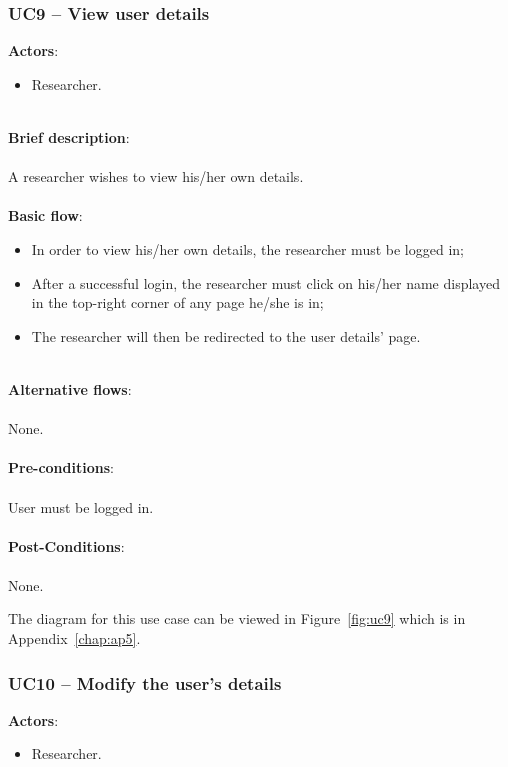 \subsubsection{UC9 -- View user details}\label{uc9}

\textbf{Actors}:

\begin{itemize}
\item Researcher.
\end{itemize}

\ \\
\textbf{Brief description}:\\
\ \\
A researcher wishes to view his/her own details.\\
\ \\
\textbf{Basic flow}:

\begin{itemize}
\item In order to view his/her own details, the researcher must be logged in;
\item After a successful login, the researcher must click on his/her name displayed in the top-right corner of any page he/she is in;
\item The researcher will then be redirected to the user details' page.
\end{itemize}

\ \\
\textbf{Alternative flows}:\\
\ \\
None.\\
\ \\
\textbf{Pre-conditions}:\\
\ \\
User must be logged in.\\
\ \\
\textbf{Post-Conditions}:\\
\ \\
None.

The diagram for this use case can be viewed in Figure~\ref{fig:uc9} which is in Appendix~\ref{chap:ap5}.

\subsubsection{UC10 -- Modify the user's details}\label{uc10}

\textbf{Actors}:

\begin{itemize}
\item Researcher.
\end{itemize}

